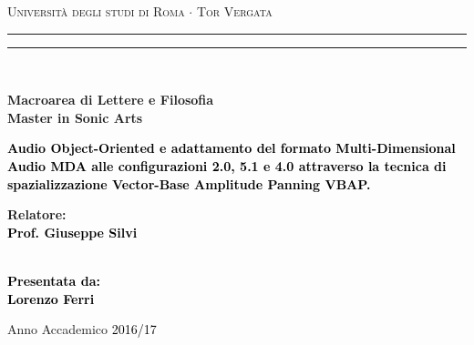 \documentclass[12pt,a4paper]{report}
\begin{document}
\begin{titlepage}
\begin{center}
{\Large{\textsc{Università degli studi di Roma $\cdot$ Tor Vergata}}}
\rule[0.1cm]{15.8cm}{0.1mm}
\rule[0.5cm]{15.8cm}{0.6mm}
\\\vspace{3mm}

{\small{\bf Macroarea di Lettere e Filosofia \\ Master in Sonic Arts}}

\end{center}

\vspace{23mm}

\begin{center}
\begin{spacing}{1.7}
\textcolor{black}{
\linespread{5}
{\LARGE{\bf
Audio Object-Oriented e adattamento del formato Multi-Dimensional Audio MDA alle configurazioni 2.0, 5.1 e 4.0 attraverso la tecnica di spazializzazione Vector-Base Amplitude Panning VBAP.
}}}

\end{spacing}
\end{center}

\vspace{50mm} \par \noindent

\begin{minipage}[t]{0.47\textwidth}

{\large{\bf Relatore: \vspace{2mm}\\\textcolor{black}{
Prof. Giuseppe Silvi}\\\\

}
}
\end{minipage}
%
\hfill
%
\begin{minipage}[t]{0.47\textwidth}\raggedleft \textcolor{black}{
{\large{\bf Presentata da:
\vspace{2mm}\\
Lorenzo Ferri}}}
\end{minipage}

\vspace{5mm}

\begin{center}

{\large{%

Anno Accademico \textcolor{black}{2016/17}}}
\end{center}

\newpage\null\thispagestyle{empty}

\end{titlepage}
\end{document}
